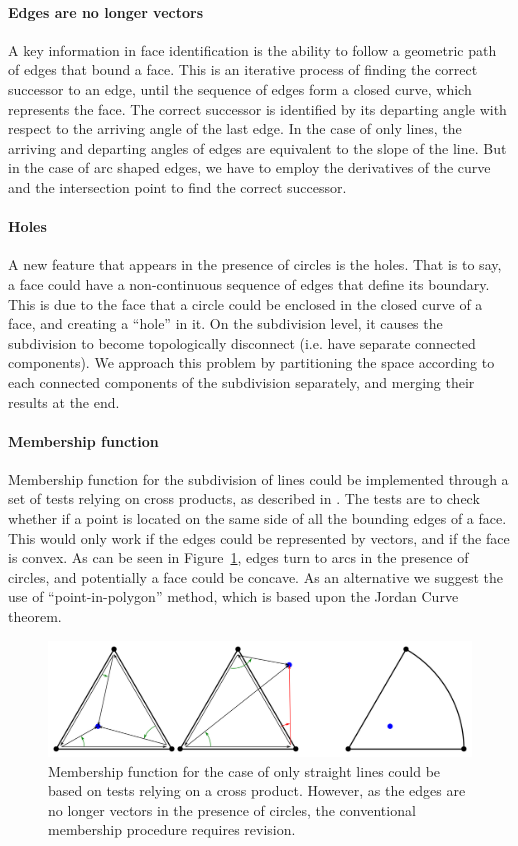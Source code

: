 \paragraph{Edges are no longer vectors}
A key information in face identification is the ability to follow a geometric path of edges that bound a face.
This is an iterative process of finding the correct successor to an edge, until the sequence of edges form a closed curve, which represents the face.
The correct successor is identified by its departing angle with respect to the arriving angle of the last edge.
In the case of only lines, the arriving and departing angles of edges are equivalent to the slope of the line.
But in the case of arc shaped edges, we have to employ the derivatives of the curve and the intersection point to find the correct successor.

\paragraph{Holes}
A new feature that appears in the presence of circles is the holes.
That is to say, a face could have a non-continuous sequence of edges that define its boundary.
This is due to the face that a circle could be enclosed in the closed curve of a face, and creating a ``hole'' in it.
On the subdivision level, it causes the subdivision to become topologically disconnect (i.e. have separate connected components).
We approach this problem by partitioning the space according to each connected components of the subdivision separately, and merging their results at the end.

\paragraph{Membership function}
Membership function for the subdivision of lines could be implemented through a set of tests relying on cross products, as described in \cite{de2000computational}.
The tests are to check whether if a point is located on the same side of all the bounding edges of a face.
This would only work if the edges could be represented by vectors, and if the face is convex.
As can be seen in Figure~\ref{fig:intro_crossProdFail}, edges turn to arcs in the presence of circles, and potentially a face could be concave.
As an alternative we suggest the use of ``point-in-polygon'' method, which is based upon the Jordan Curve theorem.

\begin{figure} %
    \centering
    \includegraphics[width=1.\textwidth]{figures/intro_crossProdFail.png}
    \caption{Membership function for the case of only straight lines could be based on tests relying on a cross product.
    However, as the edges are no longer vectors in the presence of circles, the conventional membership procedure requires revision.}
    \label{fig:intro_crossProdFail}
\end{figure}
